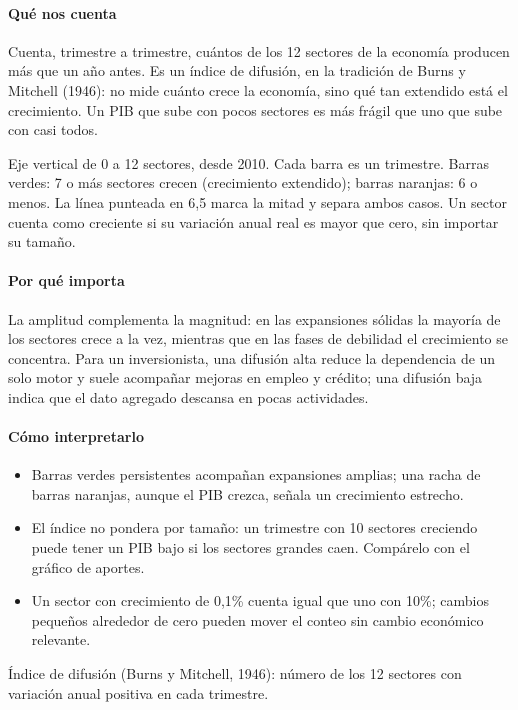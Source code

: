 \paragraph{Qué nos cuenta}
Cuenta, trimestre a trimestre, cuántos de los 12 sectores de la economía producen más que un año antes. Es un índice de difusión, en la tradición de Burns y Mitchell (1946): no mide cuánto crece la economía, sino qué tan extendido está el crecimiento. Un PIB que sube con pocos sectores es más frágil que uno que sube con casi todos.

\begin{leer}
Eje vertical de 0 a 12 sectores, desde 2010. Cada barra es un trimestre. Barras verdes: 7 o más sectores crecen (crecimiento extendido); barras naranjas: 6 o menos. La línea punteada en 6,5 marca la mitad y separa ambos casos. Un sector cuenta como creciente si su variación anual real es mayor que cero, sin importar su tamaño.
\end{leer}

\paragraph{Por qué importa}
La amplitud complementa la magnitud: en las expansiones sólidas la mayoría de los sectores crece a la vez, mientras que en las fases de debilidad el crecimiento se concentra. Para un inversionista, una difusión alta reduce la dependencia de un solo motor y suele acompañar mejoras en empleo y crédito; una difusión baja indica que el dato agregado descansa en pocas actividades.

\paragraph{Cómo interpretarlo}
\begin{itemize}
\item Barras verdes persistentes acompañan expansiones amplias; una racha de barras naranjas, aunque el PIB crezca, señala un crecimiento estrecho.
\item El índice no pondera por tamaño: un trimestre con 10 sectores creciendo puede tener un PIB bajo si los sectores grandes caen. Compárelo con el gráfico de aportes.
\item Un sector con crecimiento de 0,1\% cuenta igual que uno con 10\%; cambios pequeños alrededor de cero pueden mover el conteo sin cambio económico relevante.
\end{itemize}
\begin{formulas}[Fórmulas]
\end{formulas}
\begin{metodo}[Metodología]
Índice de difusión (Burns y Mitchell, 1946): número de los 12 sectores con variación anual positiva en cada trimestre.
\par{}
\end{metodo}

